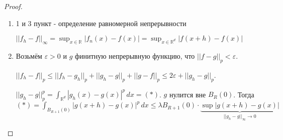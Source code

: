 \begin{proof}
    \begin{enumerate}
        \item {
            1 и 3 пункт - определение равномерной непрерывности

            $||f_h - f||_\infty = \sup_{x \in \mathbb{R}} |f_n(x) - f(x)| = \sup_{x \in \mathbb{R}^d} |f(x + h) - f(x)|$
        }
        \item {
            Возьмём $\varepsilon > 0$ и $g$ финитную непрерывную функцию, что $||f - g||_p < \varepsilon$.

            $||f_h - f||_p \leqslant ||f_h - g_h ||_p + ||g_h - g||_p + ||g - f||_p \leqslant 2\varepsilon + ||g_h - g||_p$.

            $||g_h - g||_p^p = \int_{\mathbb{R}^d} |g_h(x) - g(x)|^p \, dx = (*)$. $g$ нулится вне $B_R (0)$. Тогда 
            $(*) = \int_{B_{R + 1}(0)} |g(x + h) - g(x)|^p \, dx \leqslant \lambda B_{R + 1} (0) \cdot \underbrace{\sup |g(x + h) - g(x)|}_{||g_h - g||_{\infty} \rightarrow 0}$
        }
    \end{enumerate}
    
\end{proof}
